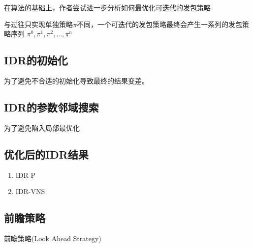 在算法的基础上，作者尝试进一步分析如何最优化可迭代的发包策略

与过往只实现单独策略$\pi$不同，一个可迭代的发包策略最终会产生一系列的发包策略序列 $\pi^0,\pi^1,\pi^2,\dots,\pi^n$

\subsection{IDR的初始化}

为了避免不合适的初始化导致最终的结果变差。

\subsection{IDR的参数邻域搜索}

为了避免陷入局部最优化

\subsection{优化后的IDR结果}

\begin{enumerate}
    \item IDR-P 
    \item IDR-VNS
\end{enumerate}

\subsection{前瞻策略}

前瞻策略(Look Ahead Strategy)